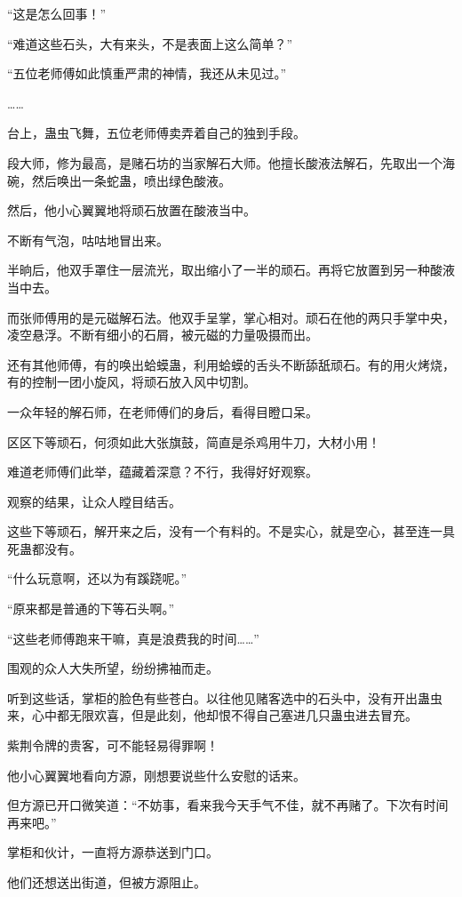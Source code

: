 \begin{this_body}
“这是怎么回事！”

“难道这些石头，大有来头，不是表面上这么简单？”

“五位老师傅如此慎重严肃的神情，我还从未见过。”

……

台上，蛊虫飞舞，五位老师傅卖弄着自己的独到手段。

段大师，修为最高，是赌石坊的当家解石大师。他擅长酸液法解石，先取出一个海碗，然后唤出一条蛇蛊，喷出绿色酸液。

然后，他小心翼翼地将顽石放置在酸液当中。

不断有气泡，咕咕地冒出来。

半晌后，他双手罩住一层流光，取出缩小了一半的顽石。再将它放置到另一种酸液当中去。

而张师傅用的是元磁解石法。他双手呈掌，掌心相对。顽石在他的两只手掌中央，凌空悬浮。不断有细小的石屑，被元磁的力量吸摄而出。

还有其他师傅，有的唤出蛤蟆蛊，利用蛤蟆的舌头不断舔舐顽石。有的用火烤烧，有的控制一团小旋风，将顽石放入风中切割。

一众年轻的解石师，在老师傅们的身后，看得目瞪口呆。

区区下等顽石，何须如此大张旗鼓，简直是杀鸡用牛刀，大材小用！

难道老师傅们此举，蕴藏着深意？不行，我得好好观察。

观察的结果，让众人瞠目结舌。

这些下等顽石，解开来之后，没有一个有料的。不是实心，就是空心，甚至连一具死蛊都没有。

“什么玩意啊，还以为有蹊跷呢。”

“原来都是普通的下等石头啊。”

“这些老师傅跑来干嘛，真是浪费我的时间……”

围观的众人大失所望，纷纷拂袖而走。

听到这些话，掌柜的脸色有些苍白。以往他见赌客选中的石头中，没有开出蛊虫来，心中都无限欢喜，但是此刻，他却恨不得自己塞进几只蛊虫进去冒充。

紫荆令牌的贵客，可不能轻易得罪啊！

他小心翼翼地看向方源，刚想要说些什么安慰的话来。

但方源已开口微笑道：“不妨事，看来我今天手气不佳，就不再赌了。下次有时间再来吧。”

掌柜和伙计，一直将方源恭送到门口。

他们还想送出街道，但被方源阻止。


\end{this_body}
